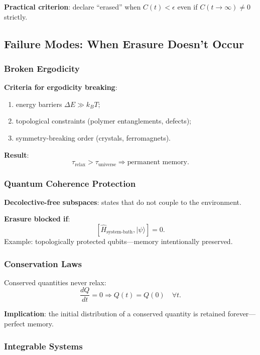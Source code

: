 \documentclass[11pt]{article}
\theoremstyle{defstyle}
\theoremstyle{mapstyle}
\begin{document}
\textbf{Practical criterion}: declare ``erased'' when $C(t)<\epsilon$ even if $C(t\to\infty)\neq 0$ strictly.

\subsection{Failure Modes: When Erasure Doesn't Occur}

\subsubsection{Broken Ergodicity}

\textbf{Criteria for ergodicity breaking}:
\begin{enumerate}[label=\arabic*.]
  \item energy barriers $\Delta E \gg k_B T$;
  \item topological constraints (polymer entanglements, defects);
  \item symmetry-breaking order (crystals, ferromagnets).
\end{enumerate}

\textbf{Result}:
\begin{equation}
\boxed{\tau_{\text{relax}} > \tau_{\text{universe}} \Rightarrow \text{permanent memory}.}
\end{equation}

\subsubsection{Quantum Coherence Protection}

\textbf{Decolective-free subspaces}: states that do not couple to the environment.

\textbf{Erasure blocked if}:
\[
[\hat{H}_{\text{system-bath}}, |\psi\rangle] = 0.
\]
Example: topologically protected qubits---memory intentionally preserved.

\subsubsection{Conservation Laws}

Conserved quantities never relax:
\[
\frac{dQ}{dt}=0 \Rightarrow Q(t)=Q(0)\quad \forall t.
\]

\textbf{Implication}: the initial distribution of a conserved quantity is retained forever---perfect memory.

\subsubsection{Integrable Systems}
\end{document}

